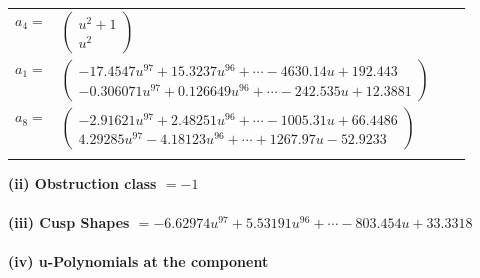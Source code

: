 \documentclass[1p]{elsarticle_modified}
\theoremstyle{definition}
\begin{document}
\begin{tabular}{m{7pt} m{180pt} m{7pt} m{180pt} }
\flushright $a_{4}=$&$\begin{pmatrix}u^2+1\\u^2\end{pmatrix}$ \\
\flushright $a_{1}=$&$\begin{pmatrix}-17.4547 u^{97}+15.3237 u^{96}+\cdots-4630.14 u+192.443\\-0.306071 u^{97}+0.126649 u^{96}+\cdots-242.535 u+12.3881\end{pmatrix}$ \\
\flushright $a_{8}=$&$\begin{pmatrix}-2.91621 u^{97}+2.48251 u^{96}+\cdots-1005.31 u+66.4486\\4.29285 u^{97}-4.18123 u^{96}+\cdots+1267.97 u-52.9233\end{pmatrix}$\\&\end{tabular}
\flushleft \textbf{(ii) Obstruction class $= -1$}\\~\\
\flushleft \textbf{(iii) Cusp Shapes $= -6.62974 u^{97}+5.53191 u^{96}+\cdots-803.454 u+33.3318$}\\~\\
\newpage\renewcommand{\arraystretch}{1}
\flushleft \textbf{(iv) u-Polynomials at the component}\newline \\
\end{document}
